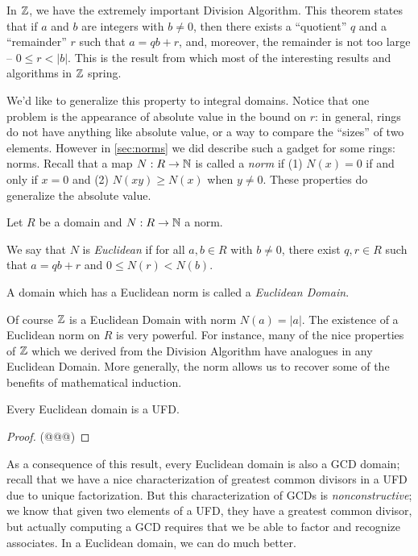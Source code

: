 In \(\mathbb{Z}\), we have the extremely important Division Algorithm.
This theorem states that if \(a\) and \(b\) are integers with \(b \neq 0\), then there exists a ``quotient'' \(q\) and a ``remainder'' \(r\) such that \(a = qb + r\), and, moreover, the remainder is not too large -- \(0 \leq r < |b|\).
This is the result from which most of the interesting results and algorithms in \(\mathbb{Z}\) spring.

We'd like to generalize this property to integral domains.
Notice that one problem is the appearance of absolute value in the bound on \(r\): in general, rings do not have anything like absolute value, or a way to compare the ``sizes'' of two elements.
However in \autoref{sec:norms} we did describe such a gadget for some rings: norms.
Recall that a map \(N : R \rightarrow \mathbb{N}\) is called a \emph{norm} if (1) \(N(x) = 0\) if and only if \(x = 0\) and (2) \(N(xy) \geq N(x)\) when \(y \neq 0\).
These properties do generalize the absolute value.

\begin{dfn}
Let \(R\) be a domain and \(N : R \rightarrow \mathbb{N}\) a norm.
\begin{proplist}
\item We say that \(N\) is \emph{Euclidean} if for all \(a,b \in R\) with \(b \neq 0\), there exist \(q,r \in R\) such that \(a = qb+r\) and \(0 \leq N(r) < N(b)\).
\item A domain which has a Euclidean norm is called a \emph{Euclidean Domain}.
\end{proplist}
\end{dfn}

Of course \(\mathbb{Z}\) is a Euclidean Domain with norm \(N(a) = |a|\).
The existence of a Euclidean norm on \(R\) is very powerful.
For instance, many of the nice properties of \(\mathbb{Z}\) which we derived from the Division Algorithm have analogues in any Euclidean Domain.
More generally, the norm allows us to recover some of the benefits of mathematical induction.

\begin{prop}
Every Euclidean domain is a UFD.
\end{prop}

\begin{proof}
(@@@)
\end{proof}

As a consequence of this result, every Euclidean domain is also a GCD domain; recall that we have a nice characterization of greatest common divisors in a UFD due to unique factorization.
But this characterization of GCDs is \emph{nonconstructive}; we know that given two elements of a UFD, they have a greatest common divisor, but actually computing a GCD requires that we be able to factor and recognize associates.
In a Euclidean domain, we can do much better.


